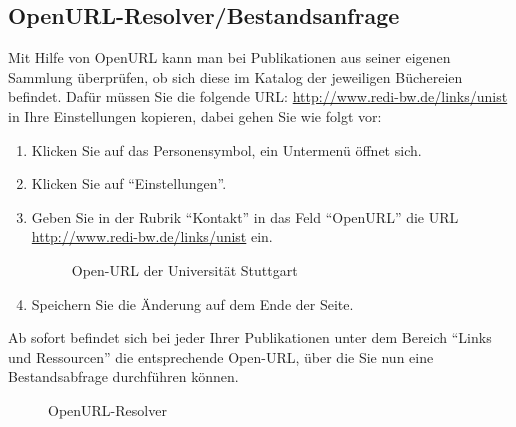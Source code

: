\subsection{OpenURL-Resolver/Bestandsanfrage}
\label{subsec:OpenURL}
Mit Hilfe von OpenURL kann man bei Publikationen aus seiner eigenen Sammlung überprüfen, ob sich diese im Katalog der jeweiligen Büchereien befindet. Dafür müssen Sie  die folgende URL:  
\url{http://www.redi-bw.de/links/unist} in Ihre Einstellungen kopieren, dabei gehen Sie wie folgt vor:
\begin{enumerate}
    \item Klicken Sie auf das Personensymbol, ein Untermenü öffnet sich.
    \item Klicken Sie auf \enquote{Einstellungen}.
    \item Geben Sie in der Rubrik \enquote{Kontakt} in das Feld \enquote{OpenURL} die URL \url{http://www.redi-bw.de/links/unist} ein. 
\begin{figure}[h!]
 \centering
 \caption{Open-URL der Universität Stuttgart}
 \label{figure031}
\end{figure}
    \item Speichern Sie die Änderung auf dem Ende der Seite.
\end{enumerate}
Ab sofort befindet sich bei jeder Ihrer Publikationen unter dem Bereich \enquote{Links und Ressourcen} die entsprechende Open-URL, über die Sie nun eine Bestandsabfrage durchführen können.
\begin{figure}[h!]
 \centering
 \caption{OpenURL-Resolver}
 \label{figure032}
\end{figure}
